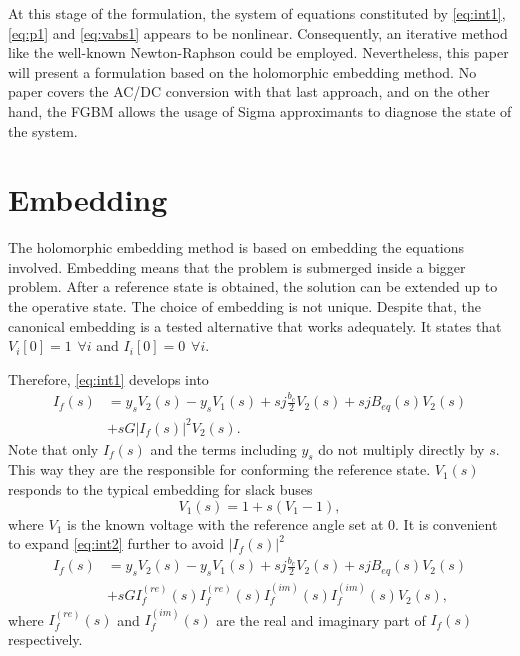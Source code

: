 \documentclass[conference]{IEEEtran}
\begin{document}
At this stage of the formulation, the system of equations constituted by \eqref{eq:int1}, \eqref{eq:p1} and \eqref{eq:vabs1} appears to be nonlinear. Consequently, an iterative method like the well-known Newton-Raphson could be employed. Nevertheless, this paper will present a formulation based on the holomorphic embedding method. No paper covers the AC/DC conversion with that last approach, and on the other hand, the FGBM allows the usage of Sigma approximants to diagnose the state of the system. 


\section{Embedding}\label{secEmbed}
The holomorphic embedding method is based on embedding the equations involved. Embedding means that the problem is submerged inside a bigger problem. After a reference state is obtained, the solution can be extended up to the operative state. The choice of embedding is not unique. Despite that, the canonical embedding is a tested alternative that works adequately. It states that $V_i[0]=1 \hspace{5pt} \forall i$ and $I_i[0]=0 \hspace{5pt} \forall i$.

Therefore, \eqref{eq:int1} develops into
\begin{equation}
  \begin{split}
  I_f(s) &= y_sV_2(s) - y_sV_1(s) + s j \frac{b_c}{2}V_2(s) + s j B_{eq}(s) V_2(s) \\
  &+ s G |I_f(s)|^2 V_2(s).
  \end{split}
  \label{eq:int2}
\end{equation}
Note that only $I_f(s)$ and the terms including $y_s$ do not multiply directly by $s$. This way they are the responsible for conforming the reference state. $V_1(s)$ responds to the typical embedding for slack buses
\begin{equation}
  V_1(s) = 1 + s(V_1 - 1),
  \label{eq:slack}
\end{equation}
where $V_1$ is the known voltage with the reference angle set at 0. It is convenient to expand \eqref{eq:int2} further to avoid $|I_f(s)|^2$
\begin{equation}
  \begin{split}
    I_f(s) &= y_sV_2(s) - y_sV_1(s) + s j \frac{b_c}{2}V_2(s) + s j B_{eq}(s) V_2(s) \\
    &+ s G I^{(re)}_f(s)I^{(re)}_f(s)I^{(im)}_f(s)I^{(im)}_f(s) V_2(s),
    \end{split}
  \label{eq:int3}
\end{equation}
where $I^{(re)}_f(s)$ and $I^{(im)}_f(s)$ are the real and imaginary part of $I_f(s)$ respectively.
\end{document}
